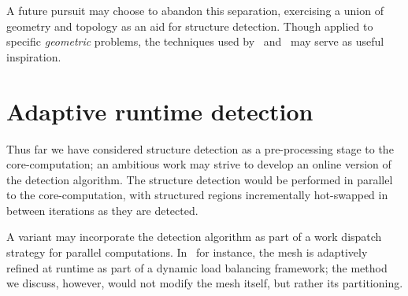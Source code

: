 A future pursuit may choose to abandon this separation, exercising a union of geometry and topology as an aid for structure detection. Though applied to specific \emph{geometric} problems, the techniques used by~\cite{rocca2011fast} and~\cite{makem2012automatic} may serve as useful inspiration.


\section{Adaptive runtime detection}
Thus far we have considered structure detection as a pre-processing stage to the core-computation; an ambitious work may strive to develop an online version of the detection algorithm. The structure detection would be performed in parallel to the core-computation, with structured regions incrementally hot-swapped in between iterations as they are detected.

A variant may incorporate the detection algorithm as part of a work dispatch strategy for parallel computations. In~\cite{li2004hierarchical} for instance, the mesh is adaptively refined at runtime as part of a dynamic load balancing framework; the method we discuss, however, would not modify the mesh itself, but rather its partitioning.




